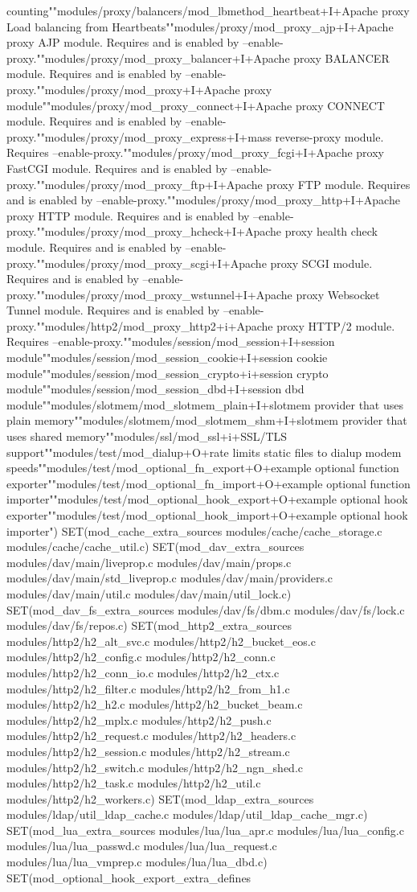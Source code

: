 counting""modules/proxy/balancers/mod_lbmethod_heartbeat+I+Apache proxy Load balancing from Heartbeats""modules/proxy/mod_proxy_ajp+I+Apache proxy AJP module.  Requires and is enabled by --enable-proxy.""modules/proxy/mod_proxy_balancer+I+Apache proxy BALANCER module.  Requires and is enabled by --enable-proxy.""modules/proxy/mod_proxy+I+Apache proxy module""modules/proxy/mod_proxy_connect+I+Apache proxy CONNECT module.  Requires and is enabled by --enable-proxy.""modules/proxy/mod_proxy_express+I+mass reverse-proxy module. Requires --enable-proxy.""modules/proxy/mod_proxy_fcgi+I+Apache proxy FastCGI module.  Requires and is enabled by --enable-proxy.""modules/proxy/mod_proxy_ftp+I+Apache proxy FTP module.  Requires and is enabled by --enable-proxy.""modules/proxy/mod_proxy_http+I+Apache proxy HTTP module.  Requires and is enabled by --enable-proxy.""modules/proxy/mod_proxy_hcheck+I+Apache proxy health check module.  Requires and is enabled by --enable-proxy.""modules/proxy/mod_proxy_scgi+I+Apache proxy SCGI module.  Requires and is enabled by --enable-proxy.""modules/proxy/mod_proxy_wstunnel+I+Apache proxy Websocket Tunnel module.  Requires and is enabled by --enable-proxy.""modules/http2/mod_proxy_http2+i+Apache proxy HTTP/2 module.  Requires --enable-proxy.""modules/session/mod_session+I+session module""modules/session/mod_session_cookie+I+session cookie module""modules/session/mod_session_crypto+i+session crypto module""modules/session/mod_session_dbd+I+session dbd module""modules/slotmem/mod_slotmem_plain+I+slotmem provider that uses plain memory""modules/slotmem/mod_slotmem_shm+I+slotmem provider that uses shared memory""modules/ssl/mod_ssl+i+SSL/TLS support""modules/test/mod_dialup+O+rate limits static files to dialup modem speeds""modules/test/mod_optional_fn_export+O+example optional function exporter""modules/test/mod_optional_fn_import+O+example optional function importer""modules/test/mod_optional_hook_export+O+example optional hook exporter""modules/test/mod_optional_hook_import+O+example optional hook importer") SET(mod_cache_extra_sources modules/cache/cache_storage.c modules/cache/cache_util.c) SET(mod_dav_extra_sources modules/dav/main/liveprop.c modules/dav/main/props.c modules/dav/main/std_liveprop.c modules/dav/main/providers.c modules/dav/main/util.c modules/dav/main/util_lock.c) SET(mod_dav_fs_extra_sources modules/dav/fs/dbm.c modules/dav/fs/lock.c modules/dav/fs/repos.c) SET(mod_http2_extra_sources modules/http2/h2_alt_svc.c modules/http2/h2_bucket_eos.c modules/http2/h2_config.c modules/http2/h2_conn.c modules/http2/h2_conn_io.c modules/http2/h2_ctx.c modules/http2/h2_filter.c modules/http2/h2_from_h1.c modules/http2/h2_h2.c modules/http2/h2_bucket_beam.c modules/http2/h2_mplx.c modules/http2/h2_push.c modules/http2/h2_request.c modules/http2/h2_headers.c modules/http2/h2_session.c modules/http2/h2_stream.c modules/http2/h2_switch.c modules/http2/h2_ngn_shed.c modules/http2/h2_task.c modules/http2/h2_util.c modules/http2/h2_workers.c) SET(mod_ldap_extra_sources modules/ldap/util_ldap_cache.c modules/ldap/util_ldap_cache_mgr.c) SET(mod_lua_extra_sources modules/lua/lua_apr.c modules/lua/lua_config.c modules/lua/lua_passwd.c modules/lua/lua_request.c modules/lua/lua_vmprep.c modules/lua/lua_dbd.c) SET(mod_optional_hook_export_extra_defines 